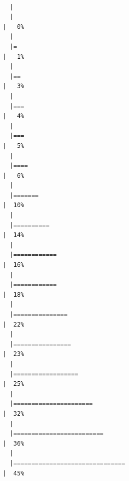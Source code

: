 \documentclass[
  letterpaper,
  DIV=11,
  numbers=noendperiod]{scrartcl}
\begin{document}
\begin{verbatim}

  |                                                                            
  |                                                                      |   0%
  |                                                                            
  |=                                                                     |   1%
  |                                                                            
  |==                                                                    |   3%
  |                                                                            
  |===                                                                   |   4%
  |                                                                            
  |===                                                                   |   5%
  |                                                                            
  |====                                                                  |   6%
  |                                                                            
  |=======                                                               |  10%
  |                                                                            
  |==========                                                            |  14%
  |                                                                            
  |============                                                          |  16%
  |                                                                            
  |============                                                          |  18%
  |                                                                            
  |===============                                                       |  22%
  |                                                                            
  |================                                                      |  23%
  |                                                                            
  |==================                                                    |  25%
  |                                                                            
  |======================                                                |  32%
  |                                                                            
  |=========================                                             |  36%
  |                                                                            
  |===============================                                       |  45%

\end{verbatim}
\end{document}
